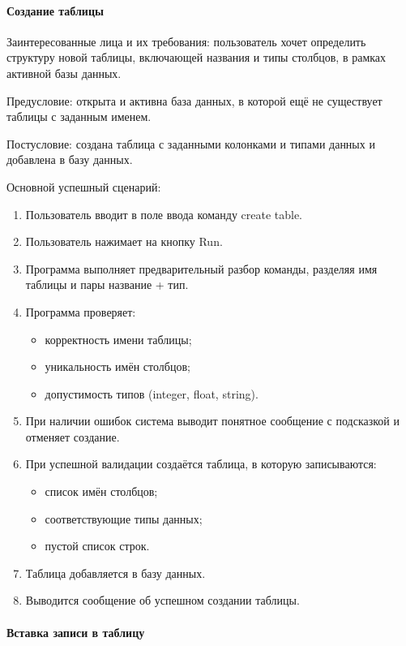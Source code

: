 \paragraph{Создание таблицы}

Заинтересованные лица и их требования: пользователь хочет определить структуру новой таблицы, включающей названия и типы столбцов, в рамках активной базы данных.

Предусловие: открыта и активна база данных, в которой ещё не существует таблицы с заданным именем.

Постусловие: создана таблица с заданными колонками и типами данных и добавлена в базу данных.

Основной успешный сценарий:
\begin{enumerate}
	\item Пользователь вводит в поле ввода команду create table.
	\item Пользователь нажимает на кнопку Run.	
	\item Программа выполняет предварительный разбор команды, разделяя имя таблицы и пары название + тип.	
	\item Программа проверяет:
	\begin{itemize}
		\item корректность имени таблицы;	
		\item уникальность имён столбцов;	
		\item допустимость типов (integer, float, string).
	\end{itemize}
	\item При наличии ошибок система выводит понятное сообщение с подсказкой и отменяет создание.	
	\item При успешной валидации создаётся таблица, в которую записываются:
	\begin{itemize}
		\item список имён столбцов;	
		\item соответствующие типы данных;	
		\item пустой список строк.
	\end{itemize}	
	\item Таблица добавляется в базу данных.	
	\item Выводится сообщение об успешном создании таблицы.
\end{enumerate}

\paragraph{Вставка записи в таблицу}

